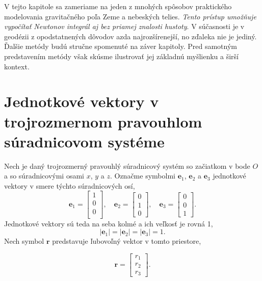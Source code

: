 \documentclass[a4paper, 12pt]{book}
\let\vec\mathbf
\begin{document}
V tejto kapitole sa zameriame na jeden z mnohých spôsobov praktického 
modelovania gravitačného poľa Zeme a nebeských telies.  \emph{Tento prístup 
umožňuje vypočítať Newtonov integrál aj bez priamej znalosti hustoty}.  
V súčasnosti je v geodézii z opodstatnených dôvodov azda najrozšírenejší, no 
zďaleka nie je jediný.  Ďalšie metódy budú stručne spomenuté na záver kapitoly.  
Pred samotným predstavením metódy však skúsme ilustrovať jej základnú myšlienku 
a širší kontext.






\section{Jednotkové vektory v trojrozmernom pravouhlom súradnicovom systéme}

Nech je daný trojrozmerný pravouhlý súradnicový systém so začiatkom v bode $O$ 
a so súradnicovými osami $x$, $y$ a $z$.  Označme symbolmi $\vec e_1$, $\vec 
e_2$ a $\vec e_3$ jednotkové vektory v smere týchto súradnicových osí,
%
\begin{equation}
\vec e_1 =
\begin{bmatrix}
1\\
0\\
0\\
\end{bmatrix}
{,} \quad
%
\vec e_2 =
\begin{bmatrix}
0\\
1\\
0
\end{bmatrix}
%
{,}\quad
%
\vec e_3 =
\begin{bmatrix}
0\\
0\\
1
\end{bmatrix}
{.}
\end{equation}
%
Jednotkové vektory sú teda na seba kolmé a ich veľkosť je rovná 1,
%
\begin{equation}
| \vec e_1 | = | \vec e_2 | = | \vec e_3 | = 1{.}
\end{equation}
%
Nech symbol $\vec r$ predstavuje ľubovoľný vektor v tomto priestore,

\begin{equation}
\vec r =
\begin{bmatrix}
r_1\\
r_2\\
r_3
\end{bmatrix}
{.}
\end{equation}
\end{document}
